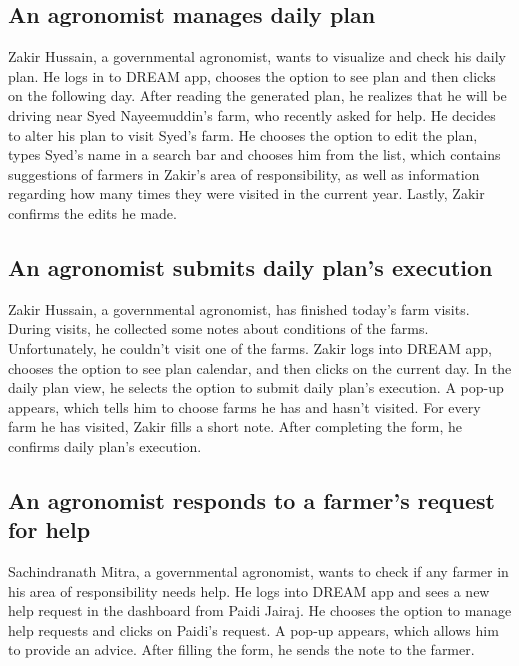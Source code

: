 \subsection*{An agronomist manages daily plan}
Zakir Hussain, a governmental agronomist, wants to visualize and check his daily plan. He logs in to DREAM app, chooses the option to see plan and then clicks on the following day. After reading the generated plan, he realizes that he will be driving near Syed Nayeemuddin's farm, who recently asked for help. He decides to alter his plan to visit Syed's farm. He chooses the option to edit the plan, types Syed's name in a search bar and chooses him from the list, which contains suggestions of farmers in Zakir's area of responsibility, as well as information regarding how many times they were visited in the current year. Lastly, Zakir confirms the edits he made.


\subsection*{An agronomist submits daily plan's execution}
Zakir Hussain, a governmental agronomist, has finished today's farm visits. During visits, he collected some notes about conditions of the farms. Unfortunately, he couldn't visit one of the farms. Zakir logs into DREAM app, chooses the option to see plan calendar, and then clicks on the current day. In the daily plan view, he selects the option to submit daily plan's execution. A pop-up appears, which tells him to choose farms he has and hasn't visited. For every farm he has visited, Zakir fills a short note. After completing the form, he confirms daily plan's execution.

\subsection*{An agronomist responds to a farmer’s request for help}
Sachindranath Mitra, a governmental agronomist, wants to check if any farmer in his area of responsibility needs help. He logs into DREAM app and sees a new help request in the dashboard from Paidi Jairaj. He chooses the option to manage help requests and clicks on Paidi's request. A pop-up appears, which allows him to provide an advice. After filling the form, he sends the note to the farmer.

